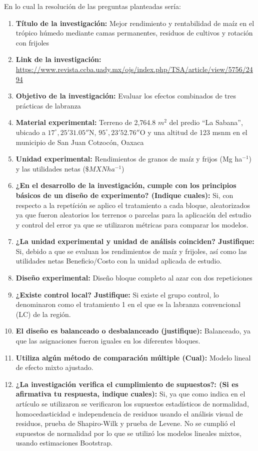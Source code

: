 En lo cual la resolución de las preguntas planteadas sería:

\begin{enumerate}
	\item \textbf{Título de la investigación:} Mejor rendimiento y rentabilidad de maíz en el trópico húmedo mediante camas permanentes, residuos de cultivos y rotación con frijoles
	\item \textbf{Link de la investigación:} \url{https://www.revista.ccba.uady.mx/ojs/index.php/TSA/article/view/5756/2494}
	\item \textbf{Objetivo de la investigación:} Evaluar los efectos combinados de tres prácticas de labranza
	\item \textbf{Material experimental:} Terreno de 2,764.8 $m^2$ del predio ``La Sabana'', ubicado a $17^{\circ},25'31.05''$N, $95^{\circ},23'52.76''$O y una altitud de 123 msnm en el municipio de San Juan Cotzocón, Oaxaca
	\item \textbf{Unidad experimental:} Rendimientos de granos de maíz y frijos (Mg ha$^{-1}$) y las utilidades netas ($\$MXN ha^{-1}$)
	\item \textbf{¿En el desarrollo de la investigación, cumple con los principios básicos de un diseño de experimento? (Indique cuales):} Si, con respecto a la repetíción se aplico el tratamiento a cada bloque, aleatorizados ya que fueron aleatorios los terrenos o parcelas para la aplicación del estudio y control del error ya que se utilizaron métricas para comparar los modelos.
	\item \textbf{¿La unidad experimental y unidad de análisis coinciden? Justifique:} Si, debido a que se evaluan los rendimientos de maíz y frijoles, así como las utilidades netas Beneficio/Costo con la unidad aplicada de estudio.
	\item \textbf{Diseño experimental:} Diseño bloque completo al azar con dos repeticiones
	\item \textbf{¿Existe control local? Justifique:} Si existe el grupo control, lo denominaron como el tratamiento 1 en el que es la labranza convencional (LC) de la región.
	\item \textbf{El diseño es balanceado o desbalanceado (justifique):} Balanceado, ya que las asignaciones fueron iguales en los diferentes bloques.
	\item \textbf{Utiliza algún método de comparación múltiple (Cual):} Modelo lineal de efecto mixto ajustado.
	\item \textbf{¿La investigación verifica el cumplimiento de supuestos?: (Si es afirmativa tu respuesta, indique cuales):} Si, ya que como indica en el artículo se utilizaron se verificaron los supuestos estadísticos de normalidad, homocedasticidad e independencia de residuos usando el análisis visual de residuos, prueba de Shapiro-Wilk y prueba de Levene. No se cumplió el supuestos de normalidad por lo que se utilizó los modelos lineales mixtos, usando estimaciones Bootstrap.
\end{enumerate}
